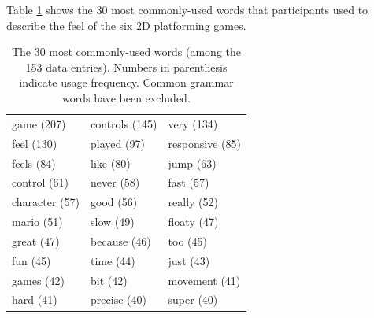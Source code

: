 Table \ref{table:mostWords} shows the 30 most commonly-used words that participants used to describe the feel of the six 2D platforming games.

\begin{table} \centering
\caption{The 30 most commonly-used words (among the 153 data entries). Numbers in parenthesis indicate usage frequency. Common grammar words have been excluded.}
\label{table:mostWords}
\begin{tabular}{lll}
\toprule
game (207) & controls (145) & very (134)\\
feel (130) & played (97) & responsive (85)\\
feels (84) & like (80) & jump (63)\\
control (61) & never (58) & fast (57)\\
character (57) & good (56) & really (52)\\
mario (51) & slow (49) & floaty (47)\\
great (47) & because (46) & too (45)\\
fun (45) & time (44) & just (43)\\
games (42) & bit (42) & movement (41)\\
hard (41) & precise (40) & super (40)\\
\bottomrule
\end{tabular}
\end{table}